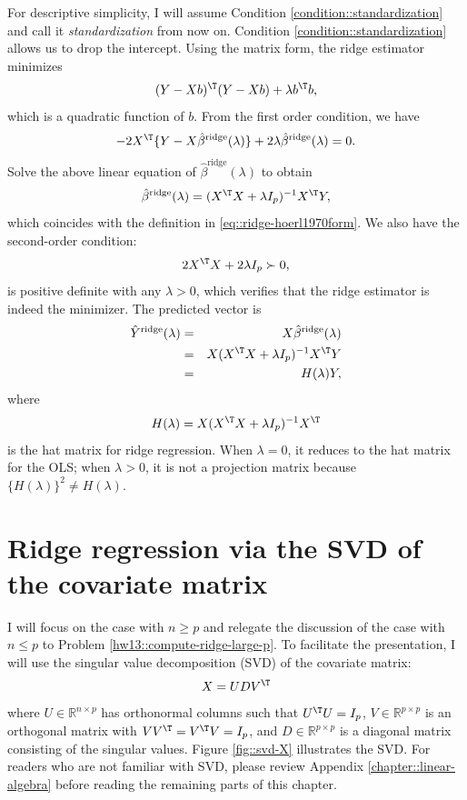 For descriptive simplicity, I will assume Condition \ref{condition::standardization} and call it {\it standardization} from now on. Condition \ref{condition::standardization} allows us to drop the intercept. Using the matrix form, the ridge estimator minimizes
\[
 (Y-Xb)^{\T}(Y-Xb)+\lambda b^{\T}b,
\]
which is a quadratic function of $b$. From the first order condition, we have
$$
-2X^{\T}\{ Y-X\hat{\beta}^{\text{ridge}}(\lambda) \} +2\lambda\hat{\beta}^{\text{ridge}}(\lambda)=0.
$$
Solve the above linear equation of $\hat{\beta}^{\text{ridge}}(\lambda)$ to obtain
$$
\hat{\beta}^{\text{ridge}}(\lambda)
=(X^{\T}X+\lambda I_{p})^{-1}X^{\T}Y,
$$
which coincides with the definition in \eqref{eq::ridge-hoerl1970form}. We also have the second-order condition:
\[
2X^{\T}X+2\lambda I_{p}\succ0,
\]
is positive definite with any $\lambda>0$, 
which verifies that the ridge estimator is indeed the minimizer. 
The predicted vector is
\begin{eqnarray*}
\hat{Y}^{\text{ridge}}(\lambda) &=& X \hat{\beta}^{\text{ridge}}(\lambda) \\
&=& X (X^{\T}X+\lambda I_{p})^{-1}X^{\T}Y \\
&=& H(\lambda) Y,
\end{eqnarray*}
where 
$$
H(\lambda)  =  X (X^{\T}X+\lambda I_{p})^{-1}X^{\T} 
$$ 
is the hat matrix for ridge regression. When $\lambda = 0$, it reduces to the hat matrix for the OLS; when $\lambda >0$, it is not a projection matrix because $\{  H(\lambda) \} ^2 \neq H(\lambda).$



\section{Ridge regression via the SVD of the covariate matrix}







I will focus on the case with $n \geq p$ and relegate the discussion of the case with $n \leq p$ to Problem \ref{hw13::compute-ridge-large-p}. 
To facilitate the presentation, I will use the singular value decomposition (SVD) of the covariate matrix:
$$
X = UDV^{\T}
$$
where $U \in \mathbb{R}^{n\times p}$ has orthonormal columns such that $U^{\T} U = I_p$, $V \in \mathbb{R}^{p\times p}$ is an orthogonal matrix with $V V^{\T} = V^{\T} V = I_p$, and $D \in \mathbb{R}^{p\times p}$ is a diagonal matrix consisting of the singular values. Figure \ref{fig::svd-X} illustrates the SVD. For readers who are not familiar with SVD, please review Appendix \ref{chapter::linear-algebra} before reading the remaining parts of this chapter. 


